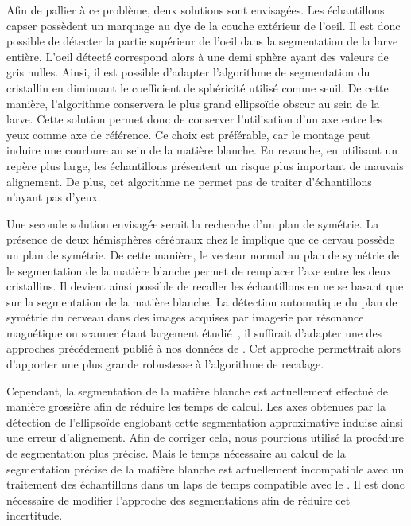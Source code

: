 \documentclass[\main/main.tex]{subfiles}
\begin{document}
Afin de pallier à ce problème, deux solutions sont envisagées.
%
Les échantillons capser possèdent un marquage au dye de la couche extérieur de l'oeil.
%
Il est donc possible de détecter la partie supérieur de l'oeil dans la segmentation de la larve entière.
%
L'oeil détecté correspond alors à une demi sphère ayant des valeurs de gris nulles.
%
Ainsi, il est possible d'adapter l'algorithme de segmentation du cristallin en diminuant le coefficient de sphéricité utilisé comme seuil.
%
De cette manière, l'algorithme conservera le plus grand ellipsoïde obscur au sein de la larve.
%
Cette solution permet donc de conserver l'utilisation d'un axe entre les yeux comme axe de référence.
%
Ce choix est préférable, car le montage peut induire une courbure au sein de la matière blanche.
%
En revanche, en utilisant un repère plus large, les échantillons présentent un risque plus important de mauvais alignement.
%
De plus, cet algorithme ne permet pas de traiter d'échantillons n'ayant pas d'yeux.

Une seconde solution envisagée serait la recherche d'un plan de symétrie.
%
La présence de deux hémisphères cérébraux chez le \pz implique que ce cervau possède un plan de symétrie.
%
De cette manière, le vecteur normal au plan de symétrie de le segmentation de la matière blanche permet de remplacer l'axe entre les deux cristallins.
%
Il devient ainsi possible de recaller les échantillons en ne se basant que sur la segmentation de la matière blanche.
%
La détection automatique du plan de symétrie du cerveau dans des images acquises par imagerie par résonance magnétique ou scanner étant largement étudié~\cite{tan_2019,noori_2020,rehman_2018},
il suffirait d'adapter une des approches précédement publié à nos données de \pz{}.
%
Cet approche permettrait alors d'apporter une plus grande robustesse à l'algorithme de recalage.

%
Cependant, la segmentation de la matière blanche est actuellement effectué de manière grossière afin de réduire les temps de calcul.
%
Les axes obtenues par la détection de l'ellipsoïde englobant cette segmentation approximative induise ainsi une erreur d'alignement.
%
Afin de corriger cela, nous pourrions utilisé la procédure de segmentation plus précise.
%
Mais le temps nécessaire au calcul de la segmentation précise de la matière blanche est actuellement incompatible avec un traitement des échantillons dans un laps de temps compatible avec le \hcs{}.
%
Il est donc nécessaire de modifier l'approche des segmentations afin de réduire cet incertitude.
\end{document}
